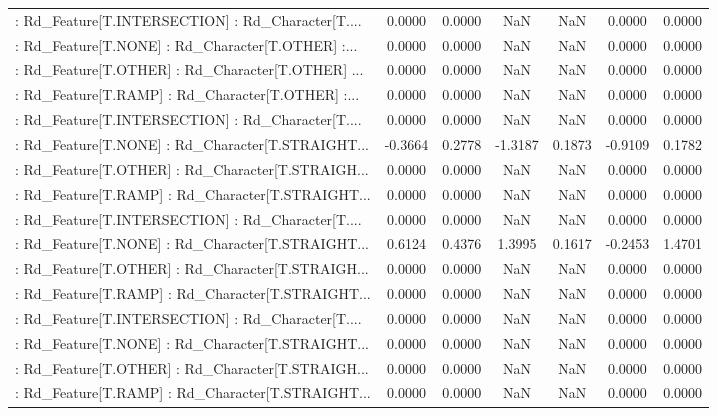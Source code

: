 \begin{longtable}{p{4cm}cccccc}
 : Rd\_Feature[T.INTERSECTION] : Rd\_Character[T.... &  0.0000 &    0.0000 &     NaN &          NaN &  0.0000 &  0.0000 \\
 : Rd\_Feature[T.NONE] : Rd\_Character[T.OTHER] :... &  0.0000 &    0.0000 &     NaN &          NaN &  0.0000 &  0.0000 \\
 : Rd\_Feature[T.OTHER] : Rd\_Character[T.OTHER] ... &  0.0000 &    0.0000 &     NaN &          NaN &  0.0000 &  0.0000 \\
 : Rd\_Feature[T.RAMP] : Rd\_Character[T.OTHER] :... &  0.0000 &    0.0000 &     NaN &          NaN &  0.0000 &  0.0000 \\
 : Rd\_Feature[T.INTERSECTION] : Rd\_Character[T.... &  0.0000 &    0.0000 &     NaN &          NaN &  0.0000 &  0.0000 \\
 : Rd\_Feature[T.NONE] : Rd\_Character[T.STRAIGHT... & -0.3664 &    0.2778 & -1.3187 &       0.1873 & -0.9109 &  0.1782 \\
 : Rd\_Feature[T.OTHER] : Rd\_Character[T.STRAIGH... &  0.0000 &    0.0000 &     NaN &          NaN &  0.0000 &  0.0000 \\
 : Rd\_Feature[T.RAMP] : Rd\_Character[T.STRAIGHT... &  0.0000 &    0.0000 &     NaN &          NaN &  0.0000 &  0.0000 \\
 : Rd\_Feature[T.INTERSECTION] : Rd\_Character[T.... &  0.0000 &    0.0000 &     NaN &          NaN &  0.0000 &  0.0000 \\
 : Rd\_Feature[T.NONE] : Rd\_Character[T.STRAIGHT... &  0.6124 &    0.4376 &  1.3995 &       0.1617 & -0.2453 &  1.4701 \\
 : Rd\_Feature[T.OTHER] : Rd\_Character[T.STRAIGH... &  0.0000 &    0.0000 &     NaN &          NaN &  0.0000 &  0.0000 \\
 : Rd\_Feature[T.RAMP] : Rd\_Character[T.STRAIGHT... &  0.0000 &    0.0000 &     NaN &          NaN &  0.0000 &  0.0000 \\
 : Rd\_Feature[T.INTERSECTION] : Rd\_Character[T.... &  0.0000 &    0.0000 &     NaN &          NaN &  0.0000 &  0.0000 \\
 : Rd\_Feature[T.NONE] : Rd\_Character[T.STRAIGHT... &  0.0000 &    0.0000 &     NaN &          NaN &  0.0000 &  0.0000 \\
 : Rd\_Feature[T.OTHER] : Rd\_Character[T.STRAIGH... &  0.0000 &    0.0000 &     NaN &          NaN &  0.0000 &  0.0000 \\
 : Rd\_Feature[T.RAMP] : Rd\_Character[T.STRAIGHT... &  0.0000 &    0.0000 &     NaN &          NaN &  0.0000 &  0.0000 \\

\end{longtable}
